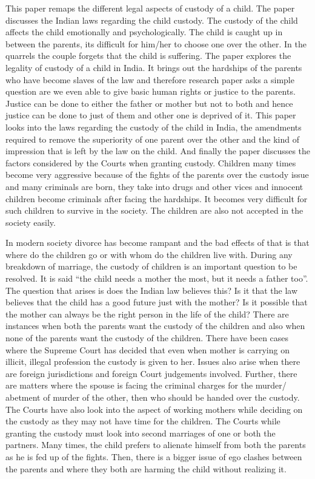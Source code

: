 \begin{multicols}{2}
\noi
This paper remaps the different legal aspects of custody of a child. The paper discusses the Indian
laws regarding the child custody. The custody of the child affects the child emotionally and
psychologically. The child is caught up in between the parents, its difficult for him/her to choose 
one over the other. In the quarrels the couple forgets that the child is suffering. The paper explores
the legality of custody of a child in India. It brings out the hardships of the parents who have
become slaves of the law and therefore research paper asks a simple question are we even able to
give basic human rights or justice to the parents. Justice can be done to either the father or mother
but not to both and hence justice can be done to just of them and other one is deprived of it. This
paper looks into the laws regarding the custody of the child in India, the amendments required to
remove the superiority of one parent over the other and the kind of impression that is left by the
law on the child. And finally the paper discusses the factors considered by the Courts when
granting custody. Children many times become very aggressive because of the fights of the
parents over the custody issue and many criminals are born, they take into drugs and other vices
and innocent children become criminals after facing the hardships. It becomes very difficult for
such children to survive in the society. The children are also not accepted in the society easily.


\noi
In modern society divorce has become rampant and the bad effects of that is that where do the
children go or with whom do the children live with. During any breakdown of marriage, the
custody of children is an important question to be resolved. It is said “the child needs a mother
the most, but it needs a father too”. The question that arises is does the Indian law believes this?
Is it that the law believes that the child has a good future just with the mother? Is it possible that
the mother can always be the right person in the life of the child? There are instances when both
the parents want the custody of the children and also when none of the parents want the custody
of the children. There have been cases where the Supreme Court has decided that even when
mother is carrying on illicit, illegal profession the custody is given to her. Issues also arise when
there are foreign jurisdictions and foreign Court judgements involved. Further, there are matters
where the spouse is facing the criminal charges for the murder/ abetment of murder of the other,
then who should be handed over the custody. The Courts have also look into the aspect of working
mothers while deciding on the custody as they may not have time for the children. The Courts
while granting the custody must look into second marriages of one or both the partners. Many
times, the child prefers to alienate himself from both the parents as he is fed up of the fights. Then,
there is a bigger issue of ego clashes between the parents and where they both are harming the
child without realizing it.


\end{multicols}

